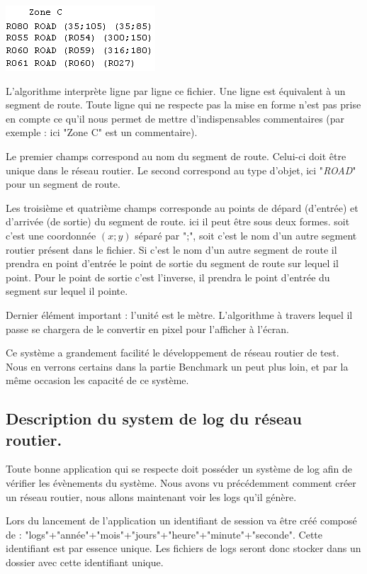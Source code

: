 \documentclass[a4paper,11pt]{article}
\begin{document}
\includegraphics[scale=0.8]{imgDiverses/roadFile.PNG}

L'algorithme interprète ligne par ligne ce fichier. Une ligne est équivalent à un segment de route. Toute ligne qui ne respecte pas la mise en forme n'est pas prise en compte ce qu'il nous permet de mettre d'indispensables commentaires (par exemple : ici "Zone C" est un commentaire).

Le premier champs correspond au nom du segment de route. Celui-ci doit être unique dans le réseau routier. Le second correspond au type d'objet, ici "\textit{ROAD}" pour un segment de route.

Les troisième et quatrième champs corresponde au points de dépard (d'entrée) et d'arrivée (de sortie) du segment de route. ici il peut être sous deux formes. soit c'est une coordonnée $(x;y)$ séparé par ";", soit c'est le nom d'un autre segment routier présent dans le fichier. Si c'est le nom d'un autre segment de route il prendra en point d'entrée le point de sortie du segment de route sur lequel il point. Pour le point de sortie c'est l'inverse, il prendra le point d'entrée du segment sur lequel il pointe. 

Dernier élément important : l'unité est le mètre. L'algorithme à travers lequel il passe se chargera de le convertir en pixel pour l'afficher à l'écran.

Ce système a grandement facilité le développement de réseau routier de test. Nous en verrons certains dans la partie Benchmark un peut plus loin, et par la même occasion les capacité de ce système.


\subsection{Description du system de log du réseau routier.}

Toute bonne application qui se respecte doit posséder un système de log afin de vérifier les évènements du système. Nous avons vu précédemment comment créer un réseau routier, nous allons maintenant voir les logs qu'il génère.

Lors du lancement de l'application un identifiant de session va être créé composé de : "logs"+"année"+"mois"+"jours"+"heure"+"minute"+"seconde". Cette identifiant est par essence unique. Les fichiers de logs seront donc stocker dans un dossier avec cette identifiant unique.
\end{document}
